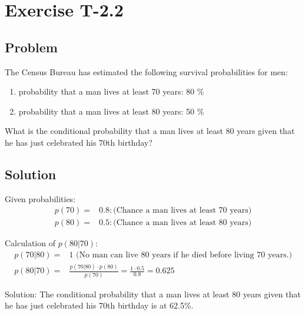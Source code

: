 \section*{Exercise T-2.2}

\subsection*{Problem}
The Census Bureau has estimated the following survival probabilities for men:
\begin{enumerate}
	\item probability that a man lives at least 70 years: 80 \%
	\item probability that a man lives at least 80 years: 50 \%
\end{enumerate}

What is the conditional probability that a man lives at least 80 years given that he has just celebrated his 70th birthday?

\subsection*{Solution}

Given probabilities:
\begin{align}
	p(70) =& 0.8: \text{(Chance a man lives at least 70 years)} \nonumber \\
	p(80) =& 0.5: \text{(Chance a man lives at least 80 years)} \nonumber
\end{align}

Calculation of $p(80|70)$:
\begin{align}
	p(70|80) =& 1 \text{ (No man can live 80 years if he died before living 70 years.)} \nonumber \\
	p(80|70) =& \frac{p(70|80)\cdot p(80)}{p(70)} = \frac{1\cdot 0.5}{0.8} = 0.625 \nonumber
\end{align}


Solution: The conditional probability that a man lives at least 80 years given that he has just celebrated his 70th birthday is at 62.5\%.